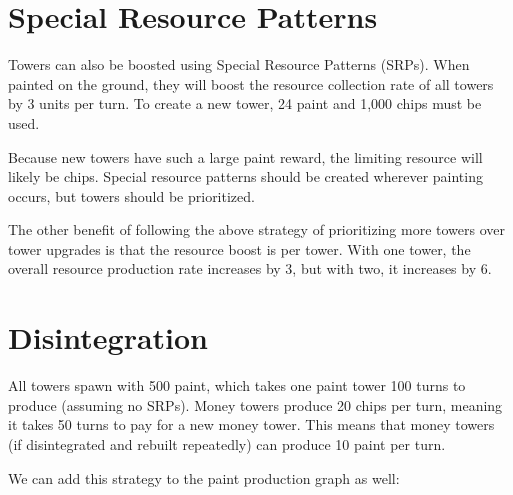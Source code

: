 \documentclass{article}
\begin{document}
  \section*{Special Resource Patterns}

  Towers can also be boosted using Special Resource Patterns (SRPs). When painted on the ground, they will boost the resource collection rate of all towers by 3 units per turn. To create a new tower, 24 paint and 1,000 chips must be used. 

  \medskip

  Because new towers have such a large paint reward, the limiting resource will likely be chips. Special resource patterns should be created wherever painting occurs, but towers should be prioritized.

  \medskip

  The other benefit of following the above strategy of prioritizing more towers over tower upgrades is that the resource boost is per tower. With one tower, the overall resource production rate increases by 3, but with two, it increases by 6.

  \section*{Disintegration}

  All towers spawn with 500 paint, which takes one paint tower 100 turns to produce (assuming no SRPs). Money towers produce 20 chips per turn, meaning it takes 50 turns to pay for a new money tower. This means that money towers (if disintegrated and rebuilt repeatedly) can produce 10 paint per turn.

  \medskip

  We can add this strategy to the paint production graph as well:
  \begin{center}
  \end{center}
\end{document}
